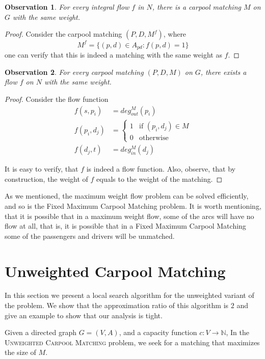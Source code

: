 \documentclass[]{llncs}
\def\N{\mathbb{N}}
\newtheorem{observation}{Observation}
\newcommand{\din}[1][M]{deg^M_{in}}
\newcommand{\dout}[1][M]{deg^M_{out}}
\def\UWCARPOOL{Unweighted Carpool Matching}
\def\FIXEDCARPOOL{Fixed Maximum Carpool Matching}
\begin{document}
\begin{observation}
For every integral flow $f$ in $N$, there is a carpool matching $M$ on $G$ with
the same weight.
\end{observation}

\begin{proof}
Consider the carpool matching $(P, D, M^f)$, where 
$$ M^f = \{(p, d) \in A_{pd} : f(p, d) = 1\} $$
one can verify that this is indeed a matching with the same weight as $f$.
\end{proof}

\begin{observation}
For every carpool matching $(P, D, M)$ on $G$, there exists a flow $f$ on $N$
with the same weight.
\end{observation}

\begin{proof}
Consider the flow function
\begin{align*}
f(s, p_i)		& = \dout(p_i)		 				\\
f(p_i, d_j)		& = 
				\begin{cases}
				1 & \text{if } (p_i, d_j) \in M		\\
				0 & \text{otherwise}
				\end{cases}						\\
f(d_j, t) 	& = \din(d_j) 
\end{align*}

It is easy to verify, that $f$ is indeed a flow function.
Also, observe, that by construction,
the weight of $f$ equals to the weight of the matching.
\end{proof}

As we mentioned, 
the maximum weight flow problem can be solved efficiently, 
and so is the \FIXEDCARPOOL{} problem.
It is worth mentioning, that it is possible that in a maximum weight flow, 
some of the arcs will have no flow at all, 
that is, it is possible that in a \FIXEDCARPOOL{}
some of the passengers and drivers will be unmatched.  

\section{\UWCARPOOL{}}
\label{sec:uwcm}
In this section we present a local search algorithm for the unweighted
variant of the problem.
We show that the approximation ratio of this algorithm is $2$ and give an example
to show that our analysis is tight.

Given a directed graph $G = (V, A)$, 
and a capacity function ${c : V \rightarrow \N}$, 
In the \textsc{\UWCARPOOL{}} problem, 
we seek for a matching that maximizes the size of $M$.
\end{document}
